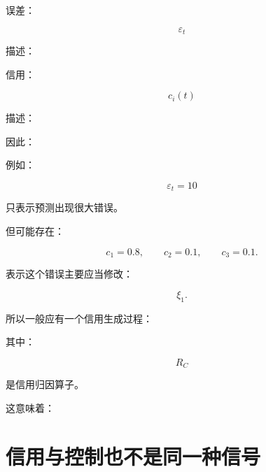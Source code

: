 误差：

\[
\varepsilon_t
\]

描述：

\begin{statementbox}
\centering
{}
\end{statementbox}

信用：

\[
c_i(t)
\]

描述：

\begin{statementbox}
\centering
{}
\end{statementbox}

因此：

\begin{statementbox}
\centering
{}
\end{statementbox}

例如：

\[
\varepsilon_t=10
\]

只表示预测出现很大错误。

但可能存在：

\[
c_1=0.8,
\qquad
c_2=0.1,
\qquad
c_3=0.1.
\]

表示这个错误主要应当修改：

\[
\xi_1.
\]

所以一般应有一个信用生成过程：

\begin{statementbox}
\centering
{}
\end{statementbox}

其中：

\[
R_C
\]

是信用归因算子。

这意味着：

\begin{statementbox}
\centering
{}
\end{statementbox}

\section{信用与控制也不是同一种信号}

